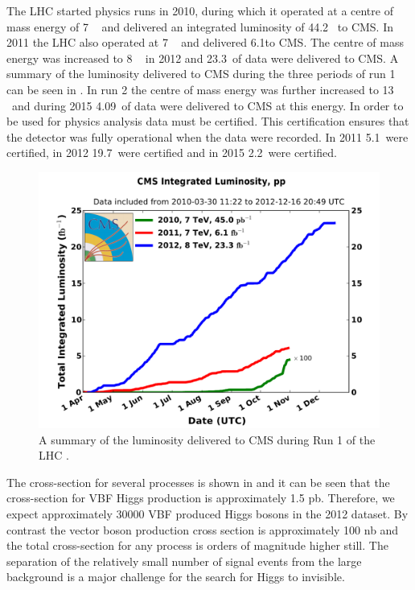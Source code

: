 The LHC started physics runs in 2010, during which it operated at a centre of mass energy of 7 \TeV~ and delivered an integrated luminosity of 44.2 \invpb ~to CMS. In 2011 the LHC also operated at 7 \TeV~ and delivered 6.1\invfb to CMS. The centre of mass energy was increased to 8 \TeV~ in 2012 and 23.3\invfb~of data were delivered to CMS. A summary of the luminosity delivered to CMS during the three periods of run 1 can be seen in . In run 2 the centre of mass energy was further increased to 13 \TeV~and during 2015 4.09\invfb~of data were delivered to CMS at this energy. In order to be used for physics analysis data must be certified. This certification ensures that the detector was fully operational when the data were recorded. In 2011 5.1\invfb~were certified, in 2012 19.7\invfb~were certified and in 2015 2.2\invfb~were certified.


\begin{figure}
  \includegraphics[width=1.2\largefigwidth]{plots/detector/int_lumi_cumulative_pp_2.pdf}
  \caption{A summary of the luminosity delivered to CMS during Run 1 of the LHC \cite{CMSLumiPublic}.}
  \label{fig:lumisummary}
\end{figure}

The cross-section for several processes is shown in  and it can be seen that the cross-section for VBF Higgs production is approximately 1.5 pb. Therefore, we expect approximately 30000 VBF produced Higgs bosons in the 2012 dataset. By contrast the vector boson production cross section is approximately 100 nb and the total cross-section for any process is orders of magnitude higher still. The separation of the relatively small number of signal events from the large background is a major challenge for the search for Higgs to invisible.

